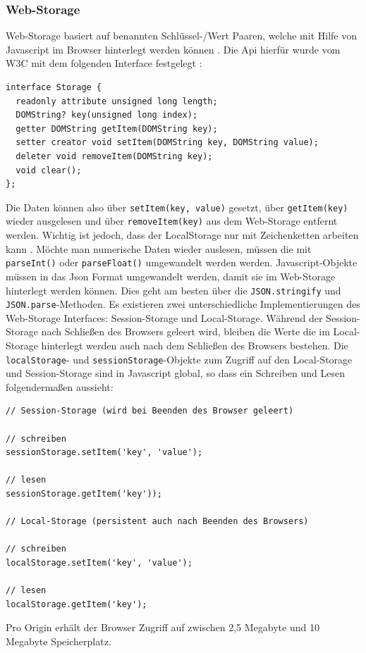 \subsubsection{Web-Storage}
Web-Storage basiert auf benannten Schlüssel-/Wert Paaren, welche mit Hilfe von Javascript im Browser hinterlegt werden können \cite{html5upandrunningchapter7}. Die Api hierfür wurde vom W3C mit dem folgenden Interface festgelegt \cite{W3C2011}:
\begin{lstlisting}
interface Storage {
  readonly attribute unsigned long length;
  DOMString? key(unsigned long index);
  getter DOMString getItem(DOMString key);
  setter creator void setItem(DOMString key, DOMString value);
  deleter void removeItem(DOMString key);
  void clear();
};
\end{lstlisting}
Die Daten können also über \texttt{setItem(key, value)} gesetzt, über \texttt{getItem(key)} wieder ausgelesen und über \texttt{removeItem(key)} aus dem Web-Storage entfernt werden. Wichtig ist jedoch, dass der LocalStorage nur mit Zeichenketten arbeiten kann \cite{W3C2011}. Möchte man numerische Daten wieder auslesen, müssen die mit \texttt{parseInt()} oder \texttt{parseFloat()} umgewandelt werden werden. Javascript-Objekte müssen in das Json Format umgewandelt werden, damit sie im Web-Storage hinterlegt werden können. Dies geht am besten über die \texttt{JSON.stringify} und \texttt{JSON.parse}-Methoden. Es existieren zwei unterschiedliche Implementierungen des Web-Storage Interfaces: Session-Storage und Local-Storage. Während der Session-Storage nach Schließen des Browsers geleert wird, bleiben die Werte die im Local-Storage hinterlegt werden auch nach dem Schließen des Browsers bestehen. Die \texttt{localStorage}- und \texttt{sessionStorage}-Objekte zum Zugriff auf den Local-Storage und Session-Storage sind in Javascript global, so dass ein Schreiben und Lesen folgendermaßen aussieht:
\begin{lstlisting}
// Session-Storage (wird bei Beenden des Browser geleert)

// schreiben
sessionStorage.setItem('key', 'value');
 
// lesen 
sessionStorage.getItem('key'));

// Local-Storage (persistent auch nach Beenden des Browsers)

// schreiben
localStorage.setItem('key', 'value');
 
// lesen
localStorage.getItem('key');
\end{lstlisting}

Pro Origin erhält der Browser Zugriff auf zwischen 2,5 Megabyte und 10 Megabyte Speicherplatz.

